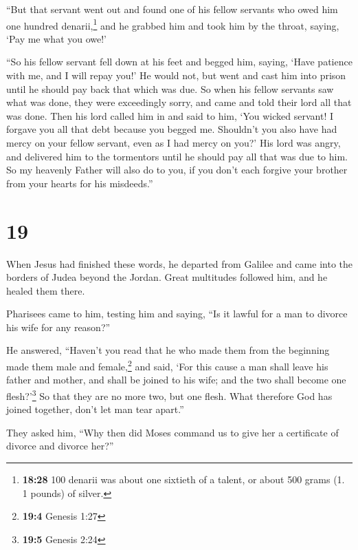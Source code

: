  ``But that servant went out and found one of his fellow
servants who owed him one hundred denarii,\footnote{\textbf{18:28} 100
  denarii was about one sixtieth of a talent, or about 500 grams (1. 1
  pounds) of silver.} and he grabbed him and took him by the throat,
saying, `Pay me what you owe!'

 ``So his fellow servant fell down at his feet and begged
him, saying, `Have patience with me, and I will repay you!'
 He would not, but went and cast him into prison until he
should pay back that which was due.  So when his fellow
servants saw what was done, they were exceedingly sorry, and came and
told their lord all that was done.  Then his lord called
him in and said to him, `You wicked servant! I forgave you all that debt
because you begged me.  Shouldn't you also have had mercy
on your fellow servant, even as I had mercy on you?'  His
lord was angry, and delivered him to the tormentors until he should pay
all that was due to him.  So my heavenly Father will also
do to you, if you don't each forgive your brother from your hearts for
his misdeeds.''

\hypertarget{section-18}{%
\section{19}\label{section-18}}

 When Jesus had finished these words, he departed from
Galilee and came into the borders of Judea beyond the Jordan.
 Great multitudes followed him, and he healed them there.

 Pharisees came to him, testing him and saying, ``Is it
lawful for a man to divorce his wife for any reason?''

 He answered, ``Haven't you read that he who made them
from the beginning made them male and female,\footnote{\textbf{19:4}
  Genesis 1:27}  and said, `For this cause a man shall
leave his father and mother, and shall be joined to his wife; and the
two shall become one flesh?'\footnote{\textbf{19:5} Genesis 2:24}
 So that they are no more two, but one flesh. What
therefore God has joined together, don't let man tear apart.''

 They asked him, ``Why then did Moses command us to give
her a certificate of divorce and divorce her?''

